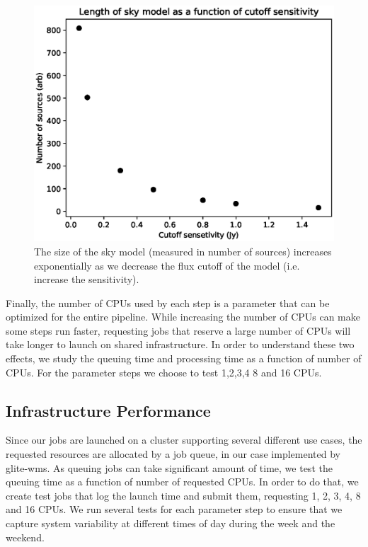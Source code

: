 \begin{figure}
    \includegraphics[width=0.95\linewidth]{figures/skymodel_size_vs_Jy.eps}
      \caption{The size of the sky model (measured in number of sources) increases exponentially as we decrease the flux cutoff of the model (i.e. increase the sensitivity).}
	\label{fig:skymodel_size}
\end{figure}


Finally, the number of CPUs used by each step is a parameter that can be optimized for the entire pipeline. While increasing the number of CPUs can make some steps run faster, requesting jobs that reserve a large number of CPUs will take longer to launch on shared infrastructure. In order to understand these two effects, we study the queuing time and processing time as a function of number of CPUs. For the parameter steps we choose to test 1,2,3,4 8 and 16 CPUs. 

\subsection{Infrastructure Performance}

Since our jobs are launched on a cluster supporting several different use cases, the requested resources are allocated by a job queue, in our case implemented by glite-wms. As queuing jobs can take significant amount of time, we test the queuing time as a function of number of requested CPUs. In order to do that, we create test jobs that log the launch time and submit them, requesting 1, 2, 3, 4, 8 and 16 CPUs. We run several tests for each parameter step to ensure that we capture system variability at different times of day during the week and the weekend. 

